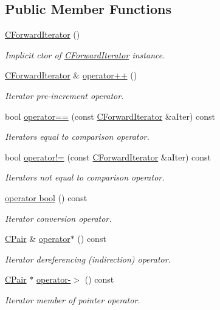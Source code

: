 \subsection*{Public Member Functions}
\begin{DoxyCompactItemize}
\item 
\hyperlink{class_c_hash_map_1_1_c_forward_iterator_a2099500f60cfbe8c8c4d801d90010085}{C\+Forward\+Iterator} ()
\begin{DoxyCompactList}\small\item\em Implicit c\textquotesingle{}tor of \hyperlink{class_c_hash_map_1_1_c_forward_iterator}{C\+Forward\+Iterator} instance. \end{DoxyCompactList}\item 
\hyperlink{class_c_hash_map_1_1_c_forward_iterator}{C\+Forward\+Iterator} \& \hyperlink{class_c_hash_map_1_1_c_forward_iterator_a91997b9621fd4f421b349a2395100184}{operator++} ()
\begin{DoxyCompactList}\small\item\em Iterator pre-\/increment operator. \end{DoxyCompactList}\item 
bool \hyperlink{class_c_hash_map_1_1_c_forward_iterator_a251df2cf775a888851a03ac68015f705}{operator==} (const \hyperlink{class_c_hash_map_1_1_c_forward_iterator}{C\+Forward\+Iterator} \&a\+Iter) const
\begin{DoxyCompactList}\small\item\em Iterators equal to comparison operator. \end{DoxyCompactList}\item 
bool \hyperlink{class_c_hash_map_1_1_c_forward_iterator_a44785d54dad6b20115e28cd9df5ac0b9}{operator!=} (const \hyperlink{class_c_hash_map_1_1_c_forward_iterator}{C\+Forward\+Iterator} \&a\+Iter) const
\begin{DoxyCompactList}\small\item\em Iterators not equal to comparison operator. \end{DoxyCompactList}\item 
\hyperlink{class_c_hash_map_1_1_c_forward_iterator_a0afdbdba3d254474cd8c40a96f0469b8}{operator bool} () const
\begin{DoxyCompactList}\small\item\em Iterator conversion operator. \end{DoxyCompactList}\item 
\hyperlink{class_c_pair}{C\+Pair} \& \hyperlink{class_c_hash_map_1_1_c_forward_iterator_a7f44403bd74fc55f0263b56cf15fc64b}{operator$\ast$} () const
\begin{DoxyCompactList}\small\item\em Iterator dereferencing (indirection) operator. \end{DoxyCompactList}\item 
\hyperlink{class_c_pair}{C\+Pair} $\ast$ \hyperlink{class_c_hash_map_1_1_c_forward_iterator_a65fde4bd503e69c29b15688cd8c21eaf}{operator-\/$>$} () const
\begin{DoxyCompactList}\small\item\em Iterator member of pointer operator. \end{DoxyCompactList}\end{DoxyCompactItemize}
